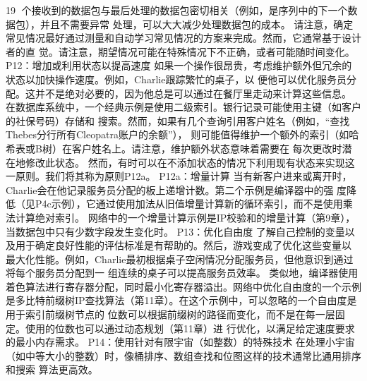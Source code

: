                                                    19
个接收到的数据包与最后处理的数据包密切相关（例如，是序列中的下一个数据包），并且不需要异常
处理，可以大大减少处理数据包的成本。
请注意，确定常见情况最好通过测量和自动学习常见情况的方案来完成。然而，它通常基于设计者的直
觉。请注意，期望情况可能在特殊情况下不正确，或者可能随时间变化。
P12：增加或利用状态以提高速度
如果一个操作很昂贵，考虑维护额外但冗余的状态以加快操作速度。例如，Charlie跟踪繁忙的桌子，以
便他可以优化服务员分配。这并不是绝对必要的，因为他总是可以通过在餐厅里走动来计算这些信息。
在数据库系统中，一个经典示例是使用二级索引。银行记录可能使用主键（如客户的社保号码）存储和
搜索。然而，如果有几个查询引用客户姓名（例如，“查找Thebes分行所有Cleopatra账户的余额”），
则可能值得维护一个额外的索引（如哈希表或B树）在客户姓名上。请注意，维护额外状态意味着需要在
每次更改时潜在地修改此状态。
然而，有时可以在不添加状态的情况下利用现有状态来实现这一原则。我们将其称为原则P12a。
P12a：增量计算
当有新客户进来或离开时，Charlie会在他记录服务员分配的板上递增计数。第二个示例是编译器中的强
度降低（见P4c示例），它通过使用加法从旧值增量计算新的循环索引，而不是使用乘法计算绝对索引。
网络中的一个增量计算示例是IP校验和的增量计算（第9章），当数据包中只有少数字段发生变化时。
P13：优化自由度
了解自己控制的变量以及用于确定良好性能的评估标准是有帮助的。然后，游戏变成了优化这些变量以
最大化性能。例如，Charlie最初根据桌子空闲情况分配服务员，但他意识到通过将每个服务员分配到一
组连续的桌子可以提高服务员效率。
类似地，编译器使用着色算法进行寄存器分配，同时最小化寄存器溢出。网络中优化自由度的一个示例
是多比特前缀树IP查找算法（第11章）。在这个示例中，可以忽略的一个自由度是用于索引前缀树节点的
位数可以根据前缀树的路径而变化，而不是在每一层固定。使用的位数也可以通过动态规划（第11章）进
行优化，以满足给定速度要求的最小内存需求。
P14：使用针对有限宇宙（如整数）的特殊技术
在处理小宇宙（如中等大小的整数）时，像桶排序、数组查找和位图这样的技术通常比通用排序和搜索
算法更高效。

